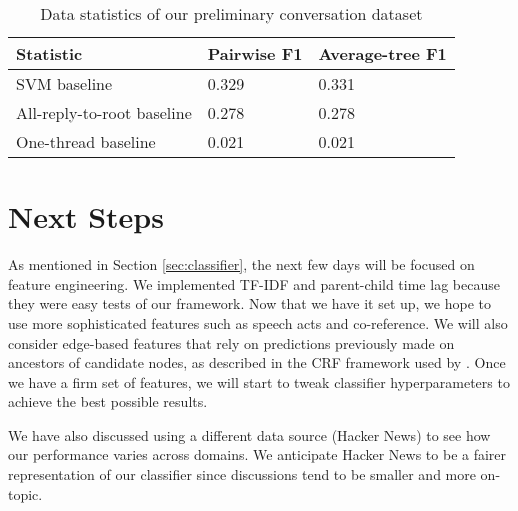 \documentclass[10pt]{article}
\begin{document}
\begin{table}[h]\footnotesize
 \begin{tabular}{| l | l | l |} 
   \hline
   \textbf{Statistic} & Pairwise F1 & Average-tree F1 \\
   \hline
    SVM baseline & 0.329 & 0.331 \\
    All-reply-to-root baseline & 0.278 & 0.278 \\
    One-thread baseline & 0.021 & 0.021 \\
   \hline
  \end{tabular}
  \caption{Data statistics of our preliminary conversation dataset}
  \label{table:results}
\end{table}

\section{Next Steps}
As mentioned in Section \ref{sec:classifier}, the next few days will be focused
on feature engineering. We implemented TF-IDF and parent-child time lag
because they were easy tests of our framework. Now that we have it set up,
we hope to use more sophisticated features such as speech acts and co-reference. We will also consider edge-based features that rely on predictions previously made on ancestors of candidate nodes, as described in the CRF framework used by \cite{Wang2011a}. Once we have a firm set of features, we will start to tweak classifier hyperparameters to achieve the best
possible results.

We have also discussed using a different data source (Hacker News) to
see how our performance varies across domains. We anticipate Hacker News
to be a fairer representation of our classifier since discussions tend to be 
smaller and more on-topic.

{} 

\end{document}
